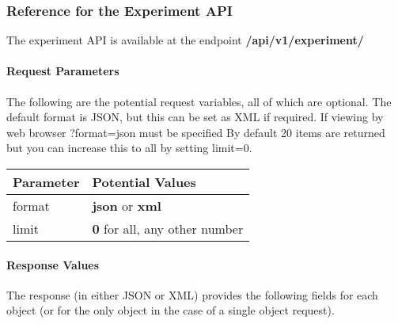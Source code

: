\documentclass[letterpaper,10pt,english]{sphinxmanual}
\begin{document}
\subsubsection{Reference for the Experiment API}
\label{data:reference-for-the-experiment-api}
The experiment API is available at the endpoint \textbf{/api/v1/experiment/}


\paragraph{Request Parameters}
\label{data:id3}
The following are the potential request variables, all of which are optional.  
The default format is JSON, but this can be set as XML if required.
If viewing by web browser ?format=json must be specified  
By default 20 items are returned but you can increase this to all by setting limit=0.

\begin{tabulary}{\linewidth}{|L|L|}
\hline
\textbf{
Parameter
} & \textbf{
Potential Values
}\\\hline

format
 & 
\textbf{json} or \textbf{xml}
\\\hline

limit
 & 
\textbf{0} for all, any other number
\\\hline
\end{tabulary}



\paragraph{Response Values}
\label{data:id4}
The response (in either JSON or XML) provides the following fields for each object (or for the only object in the case of a single object request).
\end{document}
